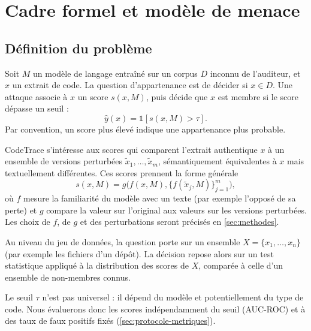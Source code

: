 \section{Cadre formel et modèle de menace}\label{sec:cadre}
	\subsection{Définition du problème}\label{sec:cadre-definition}
		Soit $M$ un modèle de langage entraîné sur un corpus $D$ inconnu de l'auditeur, et $x$ un extrait de code. La question d'appartenance est de décider si $x \in D$. Une attaque associe à $x$ un score $s(x, M)$, puis décide que $x$ est membre si le score dépasse un seuil :
		\begin{equation*}
			\hat{y}(x) = \mathbb{1}\left[ s(x, M) > \tau \right].
		\end{equation*}
		Par convention, un score plus élevé indique une appartenance plus probable.

		CodeTrace s'intéresse aux scores qui comparent l'extrait authentique $x$ à un ensemble de versions perturbées $\tilde{x}_1, \dots, \tilde{x}_m$, sémantiquement équivalentes à $x$ mais textuellement différentes. Ces scores prennent la forme générale
		\begin{equation*}
			s(x, M) = g\bigl(f(x, M), \{ f(\tilde{x}_j, M) \}_{j=1}^{m}\bigr),
		\end{equation*}
		où $f$ mesure la familiarité du modèle avec un texte (par exemple l'opposé de sa perte) et $g$ compare la valeur sur l'original aux valeurs sur les versions perturbées. Les choix de $f$, de $g$ et des perturbations seront précisés en \cref{sec:methodes}.

		Au niveau du jeu de données, la question porte sur un ensemble $X = \{x_1, \dots, x_n\}$ (par exemple les fichiers d'un dépôt). La décision repose alors sur un test statistique appliqué à la distribution des scores de $X$, comparée à celle d'un ensemble de non-membres connus.

		Le seuil $\tau$ n'est pas universel : il dépend du modèle et potentiellement du type de code. Nous évaluerons donc les scores indépendamment du seuil (AUC-ROC) et à des taux de faux positifs fixés (\cref{sec:protocole-metriques}).

